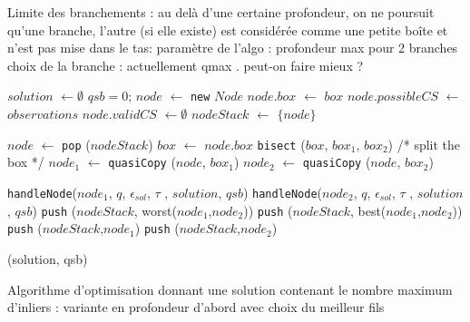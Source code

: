 \documentclass{article}
\begin{document}
Limite des branchements : au delà d'une certaine profondeur, on ne poursuit qu'une branche, l'autre (si elle existe) est consid\'er\'ee comme une petite 
boîte et n'est pas mise dans le tas:  paramètre de l'algo : profondeur max pour 2 branches
choix de la branche : actuellement qmax .
peut-on faire mieux ?

\begin{algorithm}[htb]
\SetVline
{\small
{}
{
$solution$ $\gets \emptyset$ \;
$qsb=0$;
$node$ $\gets$ {\tt new} $Node$ \;
$node.box$ $\gets$ $box$ \;
$node.possibleCS$ $\gets$ $observations$ \;
$node.validCS$ $\gets \emptyset$ \;
$nodeStack$ $\gets$ $\{node\}$ \;

 {
   $node$ $\gets$ {\tt pop} ($nodeStack$) \;
   $box$ $\gets$ $node.box$ \;
  {\tt bisect}  ($box$, $box_1$, $box_2$)  /* split the box */\;
  $node_1$ $\gets$ {\tt quasiCopy} ($node$, $box_1$) \; 
  $node_2$ $\gets$ {\tt quasiCopy} ($node$, $box_2$) \; 

  {\tt handleNode}($node_1$, $q$,
  $\epsilon_{sol}$, $\tau$ , $solution$, $qsb$) \;
  {\tt handleNode}($node_2$, $q$,
  $\epsilon_{sol}$, $\tau$ , $solution$, $qsb$) \;
{
  {\tt push} ($nodeStack$, worst($node_1$,$node_2$)) \; 
  {\tt push} ($nodeStack$, best($node_1$,$node_2$))
}
{ 
  {{\tt push} ($nodeStack$,$node_1$)}
  {
  {{\tt push} ($nodeStack$,$node_2$)}
}
}
}
\Return (solution, qsb)
}
}



\caption{Algorithme d'optimisation donnant une solution contenant le nombre maximum d'inliers : variante en profondeur d'abord avec choix du meilleur fils}
\label{algo:qinterestim}
\end{algorithm}
\end{document}

